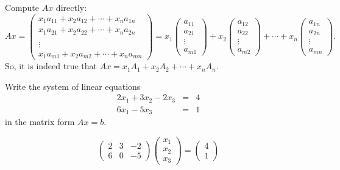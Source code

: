\documentclass{article}
\begin{document}
\begin{exercise}
\begin{solution}
Compute $Ax$ directly:
\[ Ax = \left(\begin{array}{c} x_1a_{11} + x_2a_{12} + \cdots +
x_na_{1n} \\  x_1a_{21} + x_2a_{22} + \cdots + x_na_{2n} \\
\\ \vdots \\ x_1a_{m1} + x_2a_{m2} + \cdots + x_na_{mn}
\end{array}\right) = x_1\left(\begin{array}{r} a_{11} \\ a_{21} \\
\vdots \\ a_{m1} \end{array}\right) + x_2\left(\begin{array}{r}
a_{12} \\ a_{22} \\ \vdots \\ a_{m2} \end{array}\right) + \cdots
+ x_n\left(\begin{array}{r} a_{1n} \\ a_{2n} \\
\vdots \\ a_{mn} \end{array}\right). \]
So, it is indeed true that $Ax = x_1A_1 + x_2A_2 + \cdots
+ x_nA_n$.


\end{solution}
\end{exercise}

\problemlabel

\begin{exercise} \label{c4.1.4}
Write the system of linear equations
\begin{eqnarray*}
2x_1 + 3x_2 - 2x_3 & = & 4\\
6x_1 -5x_3 & = & 1
\end{eqnarray*}
in the matrix form $Ax=b$.

\begin{solution}

\[
\left(\begin{array}{rrr} 2 & 3 & -2 \\ 6 & 0 & -5\end{array}\right) 
\left(\begin{array}{r} x_1 \\ x_2 \\ x_3\end{array}\right) = 
\left(\begin{array}{r} 4 \\ 1\end{array}\right)
\]


\end{solution}
\end{exercise}
\end{document}
